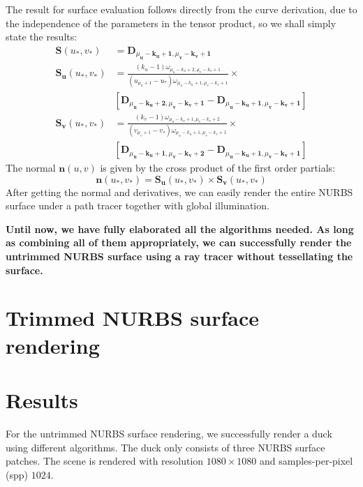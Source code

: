 \documentclass[acmtog]{acmart}
\begin{document}
The result for surface evaluation follows directly from the curve derivation, due to the independence of the parameters in the tensor product, so we shall simply state the results:
$$
\begin{aligned}
\mathbf{S}\left(u_*, v_*\right) & =\mathbf{D}_{\mu_{\mathbf{u}}-\mathbf{k}_{\mathbf{u}}+\mathbf{1}, \mu_{\mathbf{v}}-\mathbf{k}_{\mathbf{v}}+\mathbf{1}} \\
\mathbf{S}_{\mathbf{u}}\left(u_*, v_*\right) & =\frac{\left(k_u-1\right) \omega_{\mu_u-k_u+2, \mu_v-k_v+1}}{\left(u_{\mu_u+1}-u_*\right) \omega_{\mu_u-k_u+1, \mu_v-k_v+1}}\times \\
&\left[\mathbf{D}_{\mu_{\mathbf{u}}-\mathbf{k}_{\mathbf{u}}+\mathbf{2}, \mu_{\mathbf{v}}-\mathbf{k}_{\mathbf{v}}+\mathbf{1}}-\mathbf{D}_{\mu_{\mathbf{u}}-\mathbf{k}_{\mathbf{u}}+\mathbf{1}, \mu_{\mathbf{v}}-\mathbf{k}_{\mathbf{v}}+\mathbf{1}}\right] \\
\mathbf{S}_{\mathbf{v}}\left(u_*, v_*\right) & =\frac{\left(k_v-1\right) \omega_{\mu_u-k_u+1, \mu_v-k_v+2}}{\left(v_{\mu_v+1}-v_*\right) \omega_{\mu_u-k_u+1, \mu_v-k_v+1}}\times\\
&\left[\mathbf{D}_{\mu_{\mathbf{u}}-\mathbf{k}_{\mathbf{u}}+\mathbf{1}, \mu_{\mathbf{v}}-\mathbf{k}_{\mathbf{v}}+\mathbf{2}}-\mathbf{D}_{\mu_{\mathbf{u}}-\mathbf{k}_{\mathbf{u}}+\mathbf{1}, \mu_{\mathbf{v}}-\mathbf{k}_{\mathbf{v}}+\mathbf{1}}\right]
\end{aligned}
$$
The normal $\mathbf{n}(u, v)$ is given by the cross product of the first order partials:
$$
\mathbf{n}\left(u_*, v_*\right)=\mathbf{S}_{\mathbf{u}}\left(u_*, v_*\right) \times \mathbf{S}_{\mathbf{v}}\left(u_*, v_*\right)
$$
After getting the normal and derivatives, we can easily render the entire NURBS surface under a path tracer together with global illumination.

\textbf{Until now, we have fully elaborated all the algorithms needed. As long as combining all of them appropriately, we can successfully render the untrimmed NURBS surface using a ray tracer without tessellating the surface.}

\section{Trimmed NURBS surface rendering}

\section{Results}
For the untrimmed NURBS surface rendering, we successfully render a duck using different algorithms. The duck only consists of three NURBS surface patches. The scene is rendered with resolution $1080\times 1080$ and samples-per-pixel (spp) $1024$.
\end{document}
